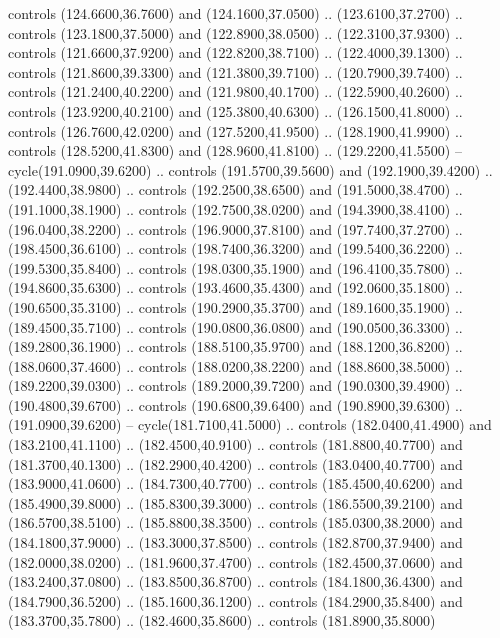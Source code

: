 {\begin{scope}[y=0.80pt, x=0.80pt, yscale=-1, xscale=1, inner sep=0pt, outer sep=0pt, #1]
      controls (124.6600,36.7600) and (124.1600,37.0500) .. (123.6100,37.2700) ..
      controls (123.1800,37.5000) and (122.8900,38.0500) .. (122.3100,37.9300) ..
      controls (121.6600,37.9200) and (122.8200,38.7100) .. (122.4000,39.1300) ..
      controls (121.8600,39.3300) and (121.3800,39.7100) .. (120.7900,39.7400) ..
      controls (121.2400,40.2200) and (121.9800,40.1700) .. (122.5900,40.2600) ..
      controls (123.9200,40.2100) and (125.3800,40.6300) .. (126.1500,41.8000) ..
      controls (126.7600,42.0200) and (127.5200,41.9500) .. (128.1900,41.9900) ..
      controls (128.5200,41.8300) and (128.9600,41.8100) .. (129.2200,41.5500) --
      cycle(191.0900,39.6200) .. controls (191.5700,39.5600) and (192.1900,39.4200)
      .. (192.4400,38.9800) .. controls (192.2500,38.6500) and (191.5000,38.4700) ..
      (191.1000,38.1900) .. controls (192.7500,38.0200) and (194.3900,38.4100) ..
      (196.0400,38.2200) .. controls (196.9000,37.8100) and (197.7400,37.2700) ..
      (198.4500,36.6100) .. controls (198.7400,36.3200) and (199.5400,36.2200) ..
      (199.5300,35.8400) .. controls (198.0300,35.1900) and (196.4100,35.7800) ..
      (194.8600,35.6300) .. controls (193.4600,35.4300) and (192.0600,35.1800) ..
      (190.6500,35.3100) .. controls (190.2900,35.3700) and (189.1600,35.1900) ..
      (189.4500,35.7100) .. controls (190.0800,36.0800) and (190.0500,36.3300) ..
      (189.2800,36.1900) .. controls (188.5100,35.9700) and (188.1200,36.8200) ..
      (188.0600,37.4600) .. controls (188.0200,38.2200) and (188.8600,38.5000) ..
      (189.2200,39.0300) .. controls (189.2000,39.7200) and (190.0300,39.4900) ..
      (190.4800,39.6700) .. controls (190.6800,39.6400) and (190.8900,39.6300) ..
      (191.0900,39.6200) -- cycle(181.7100,41.5000) .. controls (182.0400,41.4900)
      and (183.2100,41.1100) .. (182.4500,40.9100) .. controls (181.8800,40.7700)
      and (181.3700,40.1300) .. (182.2900,40.4200) .. controls (183.0400,40.7700)
      and (183.9000,41.0600) .. (184.7300,40.7700) .. controls (185.4500,40.6200)
      and (185.4900,39.8000) .. (185.8300,39.3000) .. controls (186.5500,39.2100)
      and (186.5700,38.5100) .. (185.8800,38.3500) .. controls (185.0300,38.2000)
      and (184.1800,37.9000) .. (183.3000,37.8500) .. controls (182.8700,37.9400)
      and (182.0000,38.0200) .. (181.9600,37.4700) .. controls (182.4500,37.0600)
      and (183.2400,37.0800) .. (183.8500,36.8700) .. controls (184.1800,36.4300)
      and (184.7900,36.5200) .. (185.1600,36.1200) .. controls (184.2900,35.8400)
      and (183.3700,35.7800) .. (182.4600,35.8600) .. controls (181.8900,35.8000)

\end{scope}}
